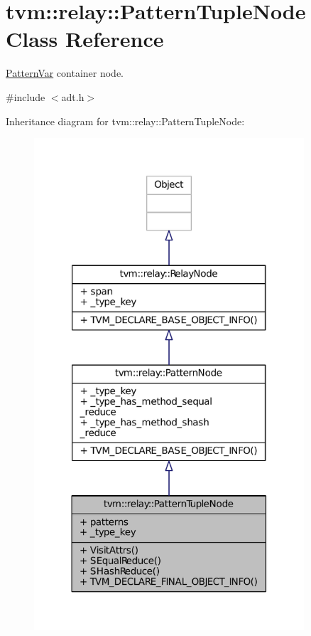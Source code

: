 \hypertarget{classtvm_1_1relay_1_1PatternTupleNode}{}\section{tvm\+:\+:relay\+:\+:Pattern\+Tuple\+Node Class Reference}
\label{classtvm_1_1relay_1_1PatternTupleNode}


\hyperlink{classtvm_1_1relay_1_1PatternVar}{Pattern\+Var} container node.  




{\ttfamily \#include $<$adt.\+h$>$}



Inheritance diagram for tvm\+:\+:relay\+:\+:Pattern\+Tuple\+Node\+:
\nopagebreak
\begin{figure}[H]
\begin{center}
\leavevmode
\includegraphics[width=285pt]{classtvm_1_1relay_1_1PatternTupleNode__inherit__graph}
\end{center}
\end{figure}


